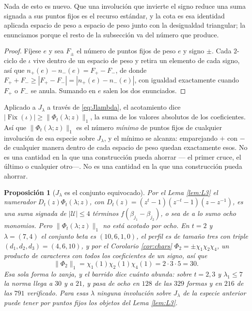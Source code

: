 \documentclass[11pt,reqno]{amsart}
\newcommand{\stverif}{\textcolor{hverif}{\small verificado}}
\theoremstyle{plain}
\newtheorem{proposition}[theorem]{Proposición}
\theoremstyle{definition}
\newcommand{\Fix}{\operatorname{Fix}}
\begin{document}
\noindent Nada de esto es nuevo. Que una involución que invierte el signo reduce una suma signada a
sus puntos fijos es el recurso estándar, y la cota es esa identidad aplicada espacio de peso a
espacio de peso junto con la desigualdad triangular; la enunciamos porque el resto de la subsección
va del número que produce.

\begin{proof}
Fíjese $e$ y sea $F_\pm$ el número de puntos fijos de peso $e$ y signo $\pm$. Cada $2$-ciclo de
$\iota$ vive dentro de un espacio de peso y retira un elemento de cada signo, así que
$n_+(e)-n_-(e)=F_+-F_-$, de donde $F_++F_-\ge|F_+-F_-|=|n_+(e)-n_-(e)|$, con igualdad exactamente
cuando $F_+$ o $F_-$ se anula. Sumando en $e$ salen los dos enunciados.
\end{proof}

Aplicado a $J_\lambda$ a través de \eqref{eq:Jlambda}, el acotamiento dice
$|\Fix(\iota)|\ge\|\Phi_t(\lambda;z)\|_1$, la suma de los valores absolutos de los coeficientes. Así
que $\|\Phi_t(\lambda;z)\|_1$ es el número \emph{mínimo} de puntos fijos de cualquier involución de
esa especie sobre $J_\lambda$, y el mínimo se alcanza: emparejando $+$ con $-$ de cualquier manera
dentro de cada espacio de peso quedan exactamente esos. No es una cantidad en la que una construcción
pueda ahorrar ---
el primer cruce, el último o cualquier otro---. No es una cantidad en la que una construcción pueda
ahorrar.

\begin{proposition}[$J_\lambda$ es el conjunto equivocado]\label{prop:wrongset}
Por el Lema \ref{lem:L3} el numerador $D_t(z)\Phi_t(\lambda;z)$, con
$D_t(z)=(z^t-1)(z^{-t}-1)(z-z^{-1})$, es una suma signada de $|\mathcal U|\le4$ términos
$f(\beta_{j_1}-\beta_{j_2})$, o sea de a lo sumo ocho monomios. Pero $\|\Phi_t(\lambda;z)\|_1$ no
está acotado por ocho. En $t=2$ y $\lambda=(7,4)$ el conjunto beta es $(10,6,1,0)$, el perfil es de
tamaño tres con triple $(d_1,d_2,d_3)=(4,6,10)$, y por el Corolario \ref{cor:chars}
$\Phi_2=\pm\chi_1\chi_2\chi_4$, un producto de caracteres con todos los coeficientes de un signo,
así que
\[
\|\Phi_2\|_1=\chi_1(1)\chi_2(1)\chi_4(1)=2\cdot3\cdot5=30 .
\]
Esa sola forma lo zanja, y el barrido dice cuánto abunda: sobre $t=2,3$ y $\lambda_1\le7$ la norma
llega a $30$ y a $21$, y pasa de ocho en $128$ de las $329$ formas y en $216$ de las $791$
\stverif. Para esas $\lambda$ ninguna
involución sobre $J_\lambda$ de la especie anterior puede tener por puntos fijos los objetos del
Lema \ref{lem:L3}.
\end{proposition}
\end{document}

